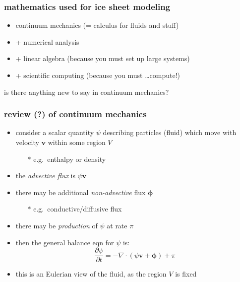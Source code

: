 \documentclass{beamer}
\begin{document}
\begin{frame}
  \frametitle{mathematics used for ice sheet modeling}
\begin{itemize}
\item continuum mechanics (= calculus for fluids and stuff)
\item + numerical analysis
\item + linear algebra (because you must set up large systems)
\item + scientific computing (because you must \dots compute!)
\end{itemize}

\bigskip\bigskip
\begin{center}
\alert{is there anything new to say in continuum mechanics?}
\end{center}
\end{frame}



\begin{frame}
  \frametitle{review (?) of continuum mechanics}

\begin{itemize}
\item consider a scalar quantity $\psi$ describing particles (fluid) which move with velocity $\mathbf{v}$ within some region $V$
  \begin{itemize}
  \item[$\ast$] e.g.~enthalpy or density
  \end{itemize}
\item the \emph{advective flux} is $\psi \mathbf{v}$
\item there may be additional \emph{non-advective} flux $\boldsymbol{\phi}$
  \begin{itemize}
  \item[$\ast$] e.g.~conductive/diffusive flux
  \end{itemize}
\item there may be \emph{production} of $\psi$ at rate $\pi$
\item then the \alert{general balance eqn} for $\psi$ is:
\begin{equation*}
  \frac{\partial \psi}{\partial t} = - \nabla \cdot \left(\psi \mathbf{v} + \boldsymbol{\phi} \right) + \pi
\end{equation*}
\item this is an Eulerian view of the fluid, as the region $V$ is fixed
\end{itemize}
\end{frame}
\end{document}

